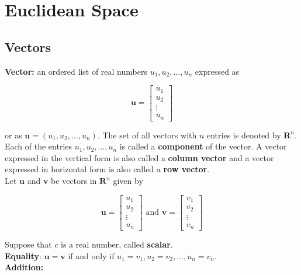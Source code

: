 \section{Euclidean Space}

    \subsection{Vectors}

        \textbf{Vector:} an ordered list of real numbers $u_1, u_2, \dots, u_n$ expressed as

        \[
            \mathbf{u} =
            \begin{bmatrix}
                u_1 \\
                u_2 \\
                \vdots \\
                u_n
            \end{bmatrix}
        \]

        or as $\mathbf{u} = (u_1, u_2, \dots, u_n)$. The set of all vectors with $n$ entries is denoted by $\mathbf{R}^n$. Each of the entries $u_1, u_2, \dots, u_n$ is called a \textbf{component} of the vector. A vector
        expressed in the vertical form is also called a \textbf{column vector} and a vector expressed in horizontal form is also called a \textbf{row vector}. \\

        Let $\mathbf{u}$ and $\mathbf{v}$ be vectors in $\mathbf{R}^n$ given by

        \[
            \mathbf{u} =
            \begin{bmatrix}
                u_1 \\
                u_2 \\
                \vdots \\
                u_n
            \end{bmatrix}
            \text{ and }
            \mathbf{v} =
            \begin{bmatrix}
                v_1 \\
                v_2 \\
                \vdots \\
                v_n
            \end{bmatrix}
        \]

        Suppose that $c$ is a real number, called  \textbf{scalar}. \\
        \textbf{Equality}: $\mathbf{u} = \mathbf{v}$ if and only if $u_1 = v_1, u_2 = v_2, \dots, u_n = v_n$. \\
        \textbf{Addition:}

